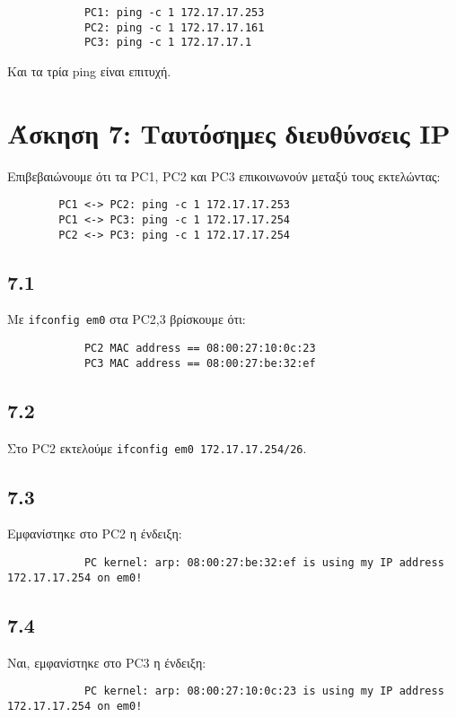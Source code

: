 \documentclass[a4paper, 12pt]{article}
\begin{document}
		\begin{verbatim}
			PC1: ping -c 1 172.17.17.253
			PC2: ping -c 1 172.17.17.161
			PC3: ping -c 1 172.17.17.1
		\end{verbatim}
		
		Και τα τρία ping είναι επιτυχή.

\section*{Άσκηση 7: Ταυτόσημες διευθύνσεις IP}

	Επιβεβαιώνουμε ότι τα PC1, PC2 και PC3 επικοινωνούν μεταξύ τους εκτελώντας:
	
	\begin{verbatim}
		PC1 <-> PC2: ping -c 1 172.17.17.253
		PC1 <-> PC3: ping -c 1 172.17.17.254
		PC2 <-> PC3: ping -c 1 172.17.17.254
	\end{verbatim}
	
	\subsection*{7.1}
		Με \verb|ifconfig em0| στα PC2,3 βρίσκουμε ότι:
		
		\begin{verbatim}
			PC2 MAC address == 08:00:27:10:0c:23
			PC3 MAC address == 08:00:27:be:32:ef
		\end{verbatim}

	\subsection*{7.2}
		Στο PC2 εκτελούμε \verb|ifconfig em0 172.17.17.254/26|.

	\subsection*{7.3}
		Εμφανίστηκε στο PC2 η ένδειξη:
		
		\begin{verbatim}
			PC kernel: arp: 08:00:27:be:32:ef is using my IP address 172.17.17.254 on em0!
		\end{verbatim}

	\subsection*{7.4}
		Ναι, εμφανίστηκε στο PC3 η ένδειξη:
		
		\begin{verbatim}
			PC kernel: arp: 08:00:27:10:0c:23 is using my IP address 172.17.17.254 on em0!
		\end{verbatim}
\end{document}
